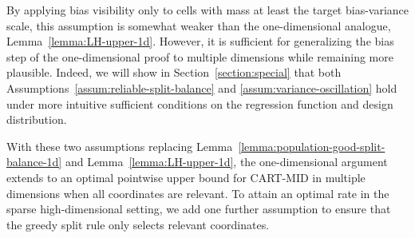 \documentclass[11pt]{article}
\theoremstyle{plain}
\theoremstyle{definition}
\theoremstyle{remark}
\theoremstyle{plain}
\newcommand{\bx}{\mathbf{x}}
\newcommand{\1}{\mathbbm{1}}
\begin{document}
By applying bias visibility only to cells with mass at least the target bias-variance scale, this assumption is somewhat weaker than the one-dimensional analogue, Lemma~\ref{lemma:LH-upper-1d}.
However, it is sufficient for generalizing the bias step of the one-dimensional proof to multiple dimensions while remaining more plausible.
Indeed, we will show in Section~\ref{section:special} that both Assumptions~\ref{assum:reliable-split-balance} and \ref{assum:variance-oscillation} hold under more intuitive sufficient conditions on the regression function and design distribution.


With these two assumptions replacing Lemma~\ref{lemma:population-good-split-balance-1d} and Lemma~\ref{lemma:LH-upper-1d}, the one-dimensional argument extends to an optimal pointwise upper bound for CART-MID in multiple dimensions when all coordinates are relevant.
To attain an optimal rate in the sparse high-dimensional setting, we add one further assumption to ensure that the greedy split rule only selects relevant coordinates.

\end{document}
